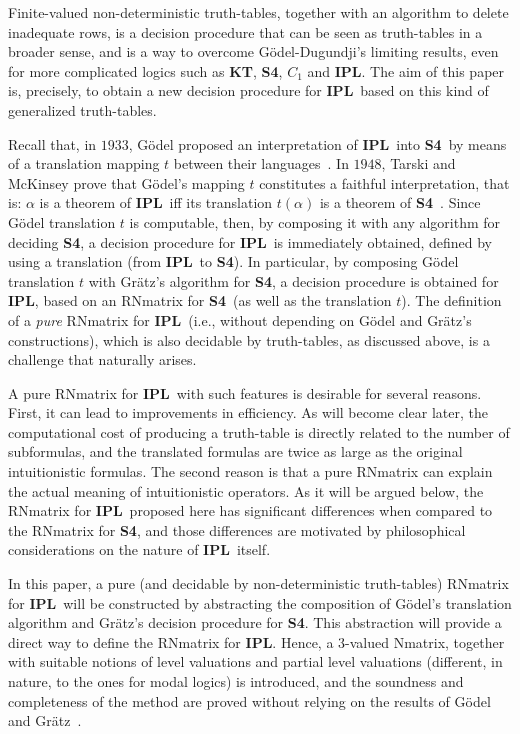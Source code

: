 \documentclass[12pt]{article}
\newcommand{\ipl}{\ensuremath{\mathbf{IPL}}}
\newcommand{\sfo}{\textbf{S4}}
\begin{document}
Finite-valued non-deterministic truth-tables, together with an algorithm to delete inadequate rows, is a decision procedure that can be seen as truth-tables in a broader sense, and is a way to overcome G\"odel-Dugundji's limiting results, even for more complicated logics such as  \textbf{KT}, \sfo, $C_1$ and \ipl. The aim of this paper is, precisely, to obtain a new decision procedure for \ipl\ based on this kind of generalized truth-tables.


Recall that, in $1933$, G\"odel proposed an interpretation of \ipl\ into \sfo\ by means of a translation mapping $t$ between their languages~\cite{Godel1933}. In $1948$, Tarski and McKinsey prove that G\"odel's mapping $t$ constitutes a faithful interpretation, that is: $\alpha$ is a theorem of \ipl\ iff its translation $t(\alpha)$ is a theorem of \sfo~\cite{McKinsey:Tarsk:48}. Since G\"odel translation $t$ is computable, then, by composing it with any algorithm for deciding \sfo, a decision procedure for \ipl\ is immediately obtained, defined by using a translation (from \ipl\ to \sfo). In particular, by composing  G\"odel translation $t$ with  Gr\"atz's algorithm for \sfo, a decision procedure is obtained for \ipl, based on an RNmatrix for \sfo\ (as well as the translation $t$). The definition of a  {\em pure} RNmatrix for \ipl\ (i.e., without depending on G\"odel and Gr\"atz's constructions), which is also decidable by truth-tables, as discussed above, is a challenge that naturally arises.

A pure RNmatrix for \ipl\ with such features is desirable for several reasons. First, it can lead to improvements in efficiency. As will become clear later, the computational cost of producing a truth-table is directly related to the number of subformulas, and the translated formulas are twice as large as the original intuitionistic formulas.  The second reason is that a pure RNmatrix can explain the actual meaning of intuitionistic operators. As it will be argued below, the RNmatrix for \ipl\ proposed here has significant differences when compared to the RNmatrix for \sfo, and those differences are motivated by philosophical considerations on the nature of \ipl\ itself.

In this paper, a pure (and decidable by non-deterministic truth-tables) RNmatrix for \ipl\ will be constructed by abstracting the composition of G\"odel's translation algorithm and Gr\"atz's decision procedure for \sfo. This abstraction will provide a direct way to define the RNmatrix for \ipl. Hence, a $3$-valued Nmatrix, together with suitable notions of level valuations and partial level valuations (different, in nature, to the ones for modal logics) is introduced, and the soundness and completeness of the method are proved without relying on the results of G\"odel~\cite{Godel1933} and Gr\"atz~\cite{gratz_truth_2022}. 
\end{document}
